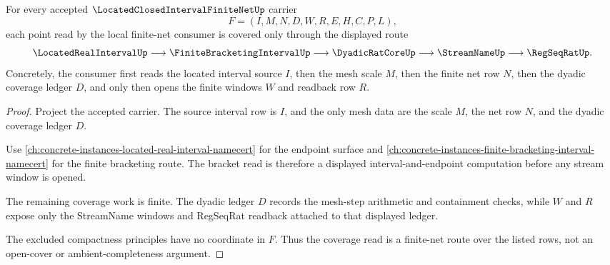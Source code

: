 \begin{theorem}
\label{thm:located-closed-interval-finite-net-coverage}
For every accepted $\LocatedClosedIntervalFiniteNetUp$ carrier
$$
F=(I,M,N,D,W,R,E,H,C,P,L),
$$
each point read by the local finite-net consumer is covered only through the displayed route
$$
\LocatedRealIntervalUp \longrightarrow \FiniteBracketingIntervalUp \longrightarrow \DyadicRatCoreUp \longrightarrow \StreamNameUp \longrightarrow \RegSeqRatUp .
$$
Concretely, the consumer first reads the located interval source $I$, then the mesh scale $M$, then the finite net row $N$, then the dyadic coverage ledger $D$, and only then opens the finite windows $W$ and readback row $R$.
\end{theorem}
\begin{proof}
Project the accepted carrier. The source interval row is $I$, and the only mesh data are the scale $M$, the net row $N$, and the dyadic coverage ledger $D$.

Use \autoref{ch:concrete-instances-located-real-interval-namecert} for the endpoint surface and \autoref{ch:concrete-instances-finite-bracketing-interval-namecert} for the finite bracketing route. The bracket read is therefore a displayed interval-and-endpoint computation before any stream window is opened.

The remaining coverage work is finite. The dyadic ledger $D$ records the mesh-step arithmetic and containment checks, while $W$ and $R$ expose only the StreamName windows and RegSeqRat readback attached to that displayed ledger.

The excluded compactness principles have no coordinate in $F$. Thus the coverage read is a finite-net route over the listed rows, not an open-cover or ambient-completeness argument.
\end{proof}

